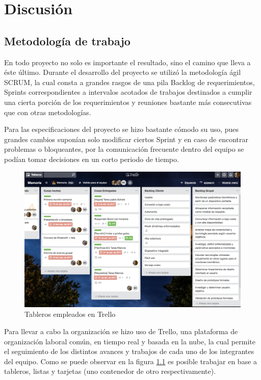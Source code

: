 \chapter{Discusión}\label{discusion}

\section{Metodología de trabajo}

En todo proyecto no solo es importante el resultado, sino el camino que lleva a éste último. Durante el desarrollo del proyecto se utilizó la metodología ágil SCRUM, la cual consta a grandes rasgos de una pila Backlog de requerimientos, Sprints correspondientes a intervalos acotados de trabajos destinados a cumplir una cierta porción de los requerimientos y reuniones bastante más consecutivas que con otras metodologías. 

Para las especificaciones del proyecto se hizo bastante cómodo su uso, pues grandes cambios suponían solo modificar ciertos Sprint y en caso de encontrar problemas o bloqueantes, por la comunicación frecuente dentro del equipo se podían tomar decisiones en un corto periodo de tiempo.

\begin{figure}[H]
	\centering
	\includegraphics[scale=0.28]{figuras/discusion/trello.png}
	\caption{Tableros empleados en Trello}
	\label{trello}
\end{figure}


Para llevar a cabo la organización se hizo uso de Trello, una plataforma de organización laboral común, en tiempo real y basada en la nube, la cual permite el seguimiento de los distintos avances y trabajos de cada uno de los integrantes del equipo. Como se puede observar en la figura \ref{trello} es posible trabajar en base a tableros, listas y tarjetas (uno contenedor de otro respectivamente).


